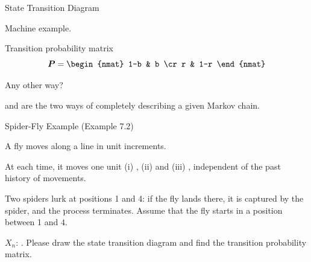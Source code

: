 \begin{frame}{State Transition Diagram}

\plitemsep 0.03in

\bci 

\item<1-> Machine example.


\item<1-> Transition probability matrix
$$
  \mat{P} = \begin{nmat}
  1-b & b \cr
  r & 1-r 
\end{nmat}
$$

  
\item<2-> Any other way? 

  
\item<4->  and 
  are the two ways of completely  describing a given Markov chain.

\eci 
\end{frame}





\begin{frame}{Spider-Fly Example (Example 7.2)}

\small
\plitemsep 0.05in

\bci 
\item A fly moves along a line in unit increments.

\item<2-> At each time, it moves one unit (i) , (ii)  and (iii) , independent of the past history of movements. 

\item<3-> Two spiders lurk at positions 1 and 4: if the fly lands there, it is captured by the spider, and the process terminates. Assume that the fly starts in a position between 1 and $4.$

\medskip
\item<4-> $X_n$: . Please draw the state transition diagram and find the transition probability matrix. 

\eci 

\vspace{-0.7cm}
\end{frame}


